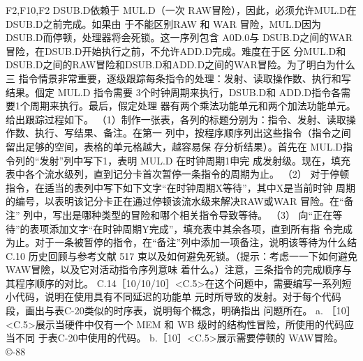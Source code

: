 F2,F10,F2
DSUB.D依赖于 MUL.D（一次 RAW冒险），因此，必须允许MUL.D在DSUB.D之前完成。如果由
于不能区别RAW 和 WAR 冒险，MUL.D因为DSUB.D而停顿，处理器将会死锁。这一序列包含
A0D.0与 DSUB.D之间的WAR冒险，在DSUB.D开始执行之前，不允许ADD.D完成。难度在于区
分MUL.D和 DSUB.D之间的RAW冒险和DSUB.D和ADD.D之间的WAR冒险。为了明白为什么三
指令情景非常重要，逐级跟踪每条指令的处理：发射、读取操作数、执行和写结果。個定 MUL.D
指令需要 3个时钟周期来执行，DSUB.D和 ADD.D指令各需要1个周期来执行。最后，假定处理
器有两个乘法功能单元和两个加法功能单元。给出跟踪过程如下。
（1）制作一张表，各列的标题分别为：指令、发射、读取操作数、执行、写结果、备注。在第一
列中，按程序顺序列出这些指令（指令之间留出足够的空间，表格的单元格越大，越容易保
存分析结果）。首先在 MUL.D指令列的“发射”列中写下1，表明 MUL.D 在时钟周期1申完
成发射级。现在，填充表中各个流水级列，直到记分卡首次暂停一条指令的周期为止。
（2） 对于停顿指令，在适当的表列中写下如下文字“在时钟周期X等待”，其中X是当前时钟
周期的编号，以表明该记分卡正在通过停顿该流水级来解决RAW或WAR 冒险。在“备注”
列中，写出是哪种类型的冒险和哪个相关指令导致等待。
（3） 向“正在等待”的表项添加文字“在时钟周期Y完成”，填充表中其余各项，直到所有指
令完成为止。对于一条被暂停的指令，在“备注”列中添加一项备注，说明该等待为什么结
C.10 历史回顾与参考文献
517
束以及如何避免死锁。（提示：考虑一一下如何避免WAW冒險，以及它对活动指令序列意味
着什么。）注意，三条指令的完成顺序与其程序顺序的对比。
C.14［10/10/10］<C.5>在这个问题中，需要编写一系列短小代码，说明在使用具有不同延迟的功能单
元时所导致的发射。对于每个代码段，画出与表C-20类似的时序表，说明每个概念，明确指出
问题所在。
a. ［10］ <C.5>展示当硬件中仅有一个 MEM 和 WB 级时的结构性冒险，所使用的代码应当不同
于表C-20中使用的代码。
b.［10］<C.5>展示需要停顿的 WAW冒险。
©-88